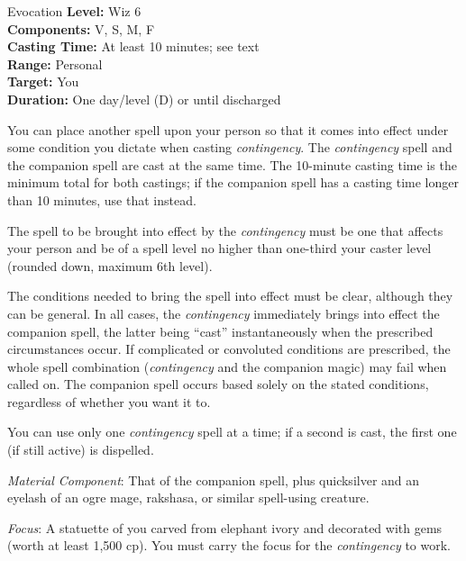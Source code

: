 {Evocation}
{
	\textbf{Level:}
	Wiz 6\\
	\textbf{Components:}
	V, S, M, F\\
	\textbf{Casting Time:}
	At least 10 minutes; see text\\
	\textbf{Range:}
	Personal\\
	\textbf{Target:}
	You\\
	\textbf{Duration:}
	One day/level (D) or until discharged\\
}
{
	You can place another spell upon your person so that it comes into effect under some condition you dictate when casting \emph{contingency}. The \emph{contingency} spell and the companion spell are cast at the same time. The 10-minute casting time is the minimum total for both castings; if the companion spell has a casting time longer than 10 minutes, use that instead.

	The spell to be brought into effect by the \emph{contingency} must be one that affects your person and be of a spell level no higher than one-third your caster level (rounded down, maximum 6th level).

	The conditions needed to bring the spell into effect must be clear, although they can be general. In all cases, the \emph{contingency} immediately brings into effect the companion spell, the latter being ``cast'' instantaneously when the prescribed circumstances occur. If complicated or convoluted conditions are prescribed, the whole spell combination (\emph{contingency} and the companion magic) may fail when called on. The companion spell occurs based solely on the stated conditions, regardless of whether you want it to.

	You can use only one \emph{contingency} spell at a time; if a second is cast, the first one (if still active) is dispelled.

	\textit{Material Component}:
	That of the companion spell, plus quicksilver and an eyelash of an ogre mage, rakshasa, or similar spell-using creature.

	\textit{Focus}:
	A statuette of you carved from elephant ivory and decorated with gems (worth at least 1,500 cp). You must carry the focus for the \emph{contingency} to work.

}
